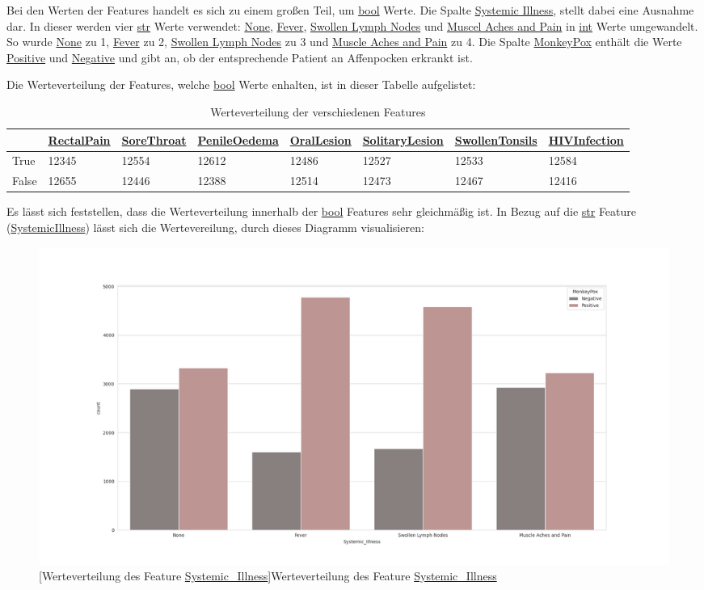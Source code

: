 \documentclass[13pt,a4paper, listof=entryprefix, bibliography=totocnumbered,toc=listofnumbered,lof=listofnumbered]{scrartcl}
\begin{document}
	Bei den Werten der Features handelt es sich zu einem großen Teil, um \url{bool} Werte. Die Spalte \url{Systemic Illness}, stellt dabei eine Ausnahme dar. In dieser werden
	vier \url{str} Werte verwendet: \url{None}, \url{Fever}, \url{Swollen Lymph Nodes} und \url{Muscel Aches and Pain} in \url{int} Werte umgewandelt. So wurde \url{None} zu 1,
	\url{Fever} zu 2, \url{Swollen Lymph Nodes} zu 3 und \url{Muscle Aches and Pain} zu 4. Die Spalte \url{MonkeyPox} enthält die Werte \url{Positive} und \url{Negative} und gibt
	an, ob der entsprechende Patient an Affenpocken erkrankt ist.

	Die Werteverteilung der Features, welche \url{bool} Werte enhalten, ist in dieser Tabelle aufgelistet: 
	
	\begin{singlespace}
	\begin{table}[H]
		\begin{adjustbox}{width=1\textwidth}
			\small
		\begin{tabular}{|l|l|l|l|l|l|l|l|}
			\hline  & \url{RectalPain}&  \url{SoreThroat}	& \url{PenileOedema} & \url{OralLesion} & \url{SolitaryLesion} &\url{SwollenTonsils} & \url{HIVInfection} \\
			\hline True & 12345 & 12554 & 12612 & 12486 & 12527 & 12533 & 12584   \\
			\hline False & 12655 & 12446 & 12388& 12514 & 12473 & 12467 & 12416 \\
			\hline
		\end{tabular}
	\end{adjustbox}
		\caption{Werteverteilung der verschiedenen Features} %
		\label{tab:werteverteilung_features}
	\end{table}
\end{singlespace}
	

	Es lässt sich feststellen, dass die Werteverteilung innerhalb der \url{bool} Features sehr gleichmäßig ist. 
	In Bezug auf die \url{str} Feature (\url{SystemicIllness}) lässt sich die Wertevereilung, durch dieses Diagramm
	visualisieren: 

	\begin{figure}[H]
		\centering
		\includegraphics[width=0.8\linewidth]{Bilder/systemic_illness_plot.png}
		[Werteverteilung des Feature \url{Systemic_Illness}]{Werteverteilung des Feature \url{Systemic_Illness}}
		\label{fig:systemic_illness_plot}
	\end{figure}
\end{document}
